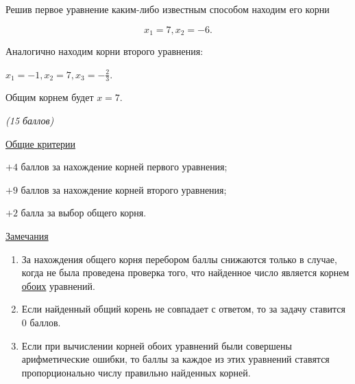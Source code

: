 \solutionSection
Решив первое уравнение каким-либо известным способом находим его корни	

    $$x_1 = 7, x_2 = -6.$$
    
Аналогично находим корни второго уравнения: 

    $x_1 = -1, x_2 = 7, x_3 = -\frac{2}{3}$.
    
Общим корнем будет $x = 7$.


\additionalCriteria

\textit{(15 баллов)}

\underline{Общие критерии}

	$+4$ баллов за нахождение корней первого уравнения;

	$+9$ баллов за нахождение корней второго уравнения;

	$+2$ балла за выбор общего корня.
	
\underline{Замечания} 

\begin{enumerate}
	\item За нахождения общего корня перебором баллы снижаются
	только в случае, когда не была проведена проверка того, что найденное
	число является корнем \underline{обоих} уравнений.

	\item Если найденный общий корень не совпадает с ответом,
	то за задачу ставится $0$ баллов.	
	 
	\item Если при вычислении корней обоих уравнений были совершены 
	арифметические ошибки, то баллы за каждое из этих уравнений ставятся
	пропорционально числу правильно найденных корней.
\end{enumerate}